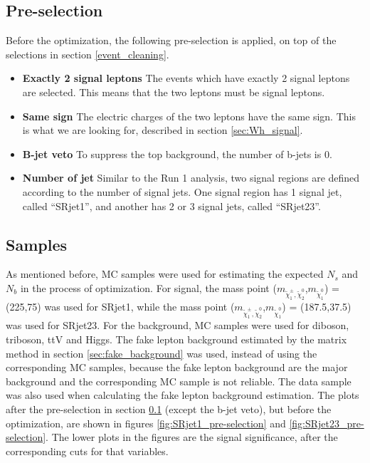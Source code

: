\subsection{Pre-selection}
\label{sec:SR_pre-selection}
Before the optimization, the following pre-selection is applied, on top of the selections in section \ref{event_cleaning}.
\begin{itemize}
\item \textbf{Exactly 2 signal leptons} The events which have exactly 2 signal leptons are selected. This means that the two leptons must be signal leptons.
\item \textbf{Same sign} The electric charges of the two leptons have the same sign. This is what we are looking for, described in section \ref{sec:Wh_signal}.
\item \textbf{B-jet veto} To suppress the top background, the number of b-jets is 0.
\item \textbf{Number of jet} Similar to the Run 1 analysis, two signal regions are defined according to the number of signal jets. One signal region has 1 signal jet, called ``SRjet1'', and another has 2 or 3 signal jets, called ``SRjet23''.
\end{itemize}

\subsection{Samples}
As mentioned before, MC samples were used for estimating the expected $N_s$ and $N_b$ in the process of optimization.
For signal, the mass point ($m_{\tilde{\chi}_1^\pm , \tilde{\chi}_2^0}$,$m_{\tilde{\chi}_1^0}$) = (225,75) was used for SRjet1, while the mass point ($m_{\tilde{\chi}_1^\pm , \tilde{\chi}_2^0}$,$m_{\tilde{\chi}_1^0}$) = (187.5,37.5) was used for SRjet23.
For the background, MC samples were used for diboson, triboson, ttV and Higgs.
The fake lepton background estimated by the matrix method in section \ref{sec:fake_background} was used, instead of using the corresponding MC samples, because the fake lepton background are the major background and the corresponding MC sample is not reliable.
The data sample was also used when calculating the fake lepton background estimation.
The plots after the pre-selection in section \ref{sec:SR_pre-selection} (except the b-jet veto), but before the optimization, are shown in figures \ref{fig:SRjet1_pre-selection} and \ref{fig:SRjet23_pre-selection}. The lower plots in the figures are the signal significance, after the corresponding cuts for that variables.

